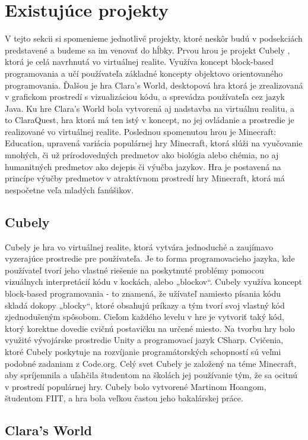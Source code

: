 \documentclass[10pt,oneside,slovak,a4paper]{article}
\begin{document}
\section{Existujúce projekty}
V tejto sekcii si spomenieme jednotlivé projekty, ktoré neskôr budú v podsekciách predstavené a budeme sa im venovať do hĺbky. Prvou hrou je projekt Cubely \cite{Cubely}, ktorá je celá navrhnutá vo virtuálnej realite. Využíva koncept block-based programovania a učí používateľa základné koncepty objektovo orientovaného programovania. Ďalšou je hra Clara's World, desktopová hra ktorá je zrealizovaná v grafickom prostredí s vizualizáciou kódu, a sprevádza používateľa cez jazyk Java. Ku hre Clara's World bola vytvorená aj nadstavba na virtuálnu realitu, a to ClaraQuest, hra ktorá má ten istý v koncept, no jej ovládanie a prostredie je realizované vo virtuálnej realite. Poslednou spomenutou hrou je Minecraft: Education, upravená variácia populárnej hry Minecraft, ktorá slúži na vyučovanie mnohých, či už prírodovedných predmetov ako biológia alebo chémia, no aj humanitných predmetov ako dejepis či výučba jazykov. Hra je postavená na princípe výučby predmetov v atraktívnom prostredí hry Minecraft, ktorá má nespočetne veľa mladých fanúšikov.

\subsection{Cubely}
 Cubely je hra vo virtuálnej realite, ktorá vytvára jednoduché a zaujímavo vyzerajúce prostredie pre používateľa. Je to forma programovacieho jazyka, kde používateľ tvorí jeho vlastné riešenie na poskytnuté problémy pomocou vizuálnych interpretácií kódu v kockách, alebo „blockov“. Cubely využíva koncept block-based programovania - to znamená, že užívateľ namiesto písania kódu skladá dokopy „blocky“, ktoré obsahujú príkazy a tým tvorí svoj vlastný kód zjednodušeným spôsobom. Cieľom každého levelu v hre je vytvoriť taký kód, ktorý korektne dovedie cvičnú postavičku na určené miesto. Na tvorbu hry bolo využité vývojárske prostredie Unity a programovací jazyk CSharp. Cvičenia, ktoré Cubely poskytuje na rozvíjanie programátorských schopností sú veľmi podobné zadaniam z Code.org. Celý svet Cubely je založený na téme Minecraft, aby spríjemnila a uľahčila študentom na školách jej používanie tým, že sa ocitnú v prostredí populárnej hry. Cubely bolo vytvorené Martinom Hoangom, študentom FIIT, a hra bola veľkou častou jeho bakalárskej práce.

\subsection{Clara's World}
\end{document}
